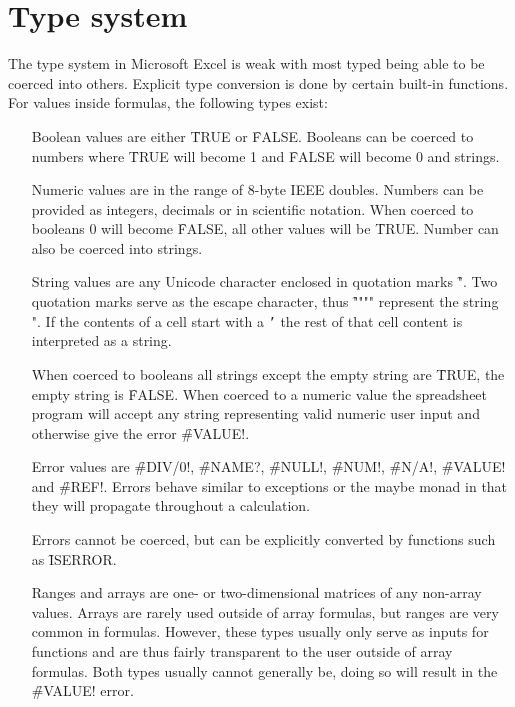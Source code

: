 \section{Type system}

The type system in Microsoft Excel is weak with most typed being able to be coerced into others.
Explicit type conversion is done by certain built-in functions.
For values inside formulas, the following types exist:

\begin{itemize}
\item[Boolean] values are either \f{TRUE} or \f{FALSE}. Booleans can be coerced to numbers where \f{TRUE} will become 1 and \f{FALSE} will become 0 and strings.
\item[Numeric] values are in the range of 8-byte IEEE doubles. Numbers can be provided as integers, decimals or in scientific notation.
When coerced to booleans 0 will become \f{FALSE}, all other values will be \f{TRUE}. Number can also be coerced into strings.
\item[String] values are any Unicode character enclosed in quotation marks \f{"}.
Two quotation marks serve as the escape character, thus \f{""""} represent the string ".
If the contents of a cell start with a \texttt{'} the rest of that cell content is interpreted as a string.

When coerced to booleans all strings except the empty string are \f{TRUE}, the empty string is \f{FALSE}.
When coerced to a numeric value the spreadsheet program will accept any string representing valid numeric user input and otherwise give the error \f{\#VALUE!}.
\item[Error] values are \f{\#DIV/0!}, \f{\#NAME?}, \f{\#NULL!}, \f{\#NUM!}, \f{\#N/A!}, \f{\#VALUE!} and \f{\#REF!}.
Errors behave similar to exceptions or the maybe monad in that they will propagate throughout a calculation.

Errors cannot be coerced, but can be explicitly converted by functions such as \f{ISERROR}.

\item[Ranges and arrays] are one- or two-dimensional matrices of any non-array values. Arrays are rarely used outside of array formulas, but ranges are very common in formulas.
However, these types usually only serve as inputs for functions and are thus fairly transparent to the user outside of array formulas.
Both types usually cannot generally be, doing so will result in the \f{\#VALUE!} error.
\end{itemize}

